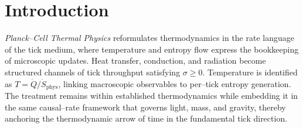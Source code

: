 \section*{Introduction}

\emph{Planck--Cell Thermal Physics} reformulates thermodynamics in the rate
language of the tick medium, where temperature and entropy flow express the
bookkeeping of microscopic updates.  Heat transfer, conduction, and radiation
become structured channels of tick throughput satisfying $\sigma \ge 0$.
Temperature is identified as $T = \dot{Q}/\dot{S}_{\mathrm{phys}}$, linking
macroscopic observables to per--tick entropy generation.  The treatment remains
within established thermodynamics while embedding it in the same causal--rate
framework that governs light, mass, and gravity, thereby anchoring the
thermodynamic arrow of time in the fundamental tick direction.
